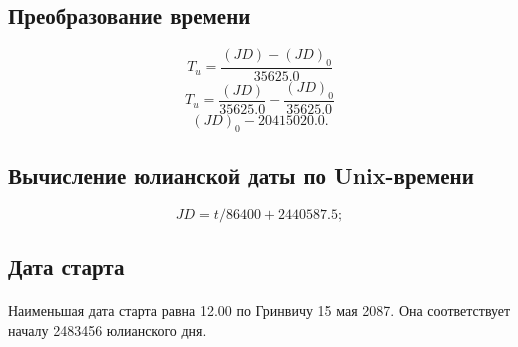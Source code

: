 \subsection{Преобразование времени}
$$T_u = \frac{(JD) - (JD)_0}{35625.0}$$
$$T_u = \frac{(JD)}{35625.0} - \frac{(JD)_0}{35625.0}$$
$$(JD)_0 - 20415020.0.$$

\subsection{Вычисление юлианской даты по Unix-времени}
$$JD = t/86400 + 2440587.5;$$

\subsection{Дата старта}
\paragraph{}Наименьшая дата старта равна 12.00 по Гринвичу 15 мая 2087. Она соответствует началу 2483456 юлианского дня.
